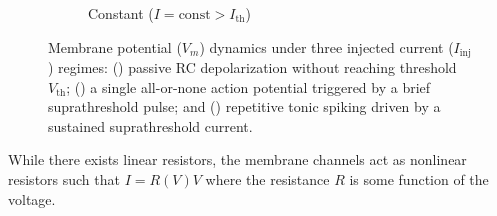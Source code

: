 \documentclass{article}
\begin{document}
\begin{figure}[htbp]
\begin{subfigure}[b]{0.32\textwidth}
{%
        }
        \caption{Constant ($I = \text{const} > I_{\text{th}}$)}
        \label{fig:ap-constant}
    \end{subfigure}

    \caption{Membrane potential ($V_m$) dynamics under three injected current ($I_{\text{inj}}$) regimes: () passive RC depolarization without reaching threshold $V_{\text{th}}$; () a single all-or-none action potential triggered by a brief suprathreshold pulse; and () repetitive tonic spiking driven by a sustained suprathreshold current.}
    \label{fig:ap-regimes-grid}
\end{figure}
While there exists linear resistors, the membrane channels act as nonlinear resistors such that $I=R(V)V$ where the resistance $R$ is some function of the voltage. 
\end{document}

